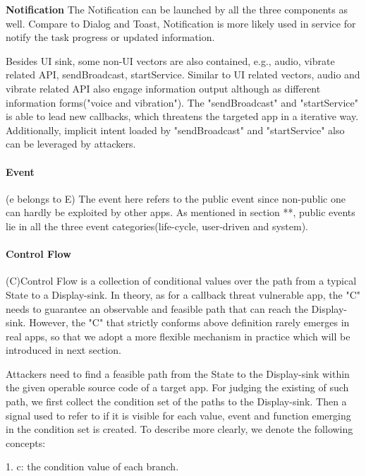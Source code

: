 \documentclass{sig-alternate-05-2015}
\begin{document}
\textbf{Notification}
The Notification can be launched by all the three components as well. Compare to Dialog and Toast, Notification is more likely used in service for notify the task progress or updated information. 



Besides UI sink, some non-UI vectors are also contained, e.g., audio, vibrate related API, sendBroadcast, startService. Similar to UI related vectors, audio and vibrate related API also engage information output although as different information forms("voice and vibration"). The "sendBroadcast" and "startService" is able to lead new callbacks, which threatens the targeted app in a iterative way. Additionally, implicit intent loaded by "sendBroadcast" and "startService" also can be leveraged by attackers.

\paragraph{Event}

(e belongs to E) The event here refers to the public event since non-public one can hardly be exploited by other apps. As mentioned in section **, public events lie in all the three event categories(life-cycle, user-driven and system).



\paragraph{Control Flow}

(C)Control Flow is a collection of conditional values over the path from a typical State to a Display-sink. In theory, as for a callback threat vulnerable app, the "C" needs to guarantee an observable and feasible path that can reach the Display-sink. However, the "C" that strictly conforms above definition rarely emerges in real apps, so that we adopt a more flexible mechanism in practice which will be introduced in next section.  

Attackers need to find a feasible path from the State to the Display-sink within the given operable source code of a target app. For judging the existing of such path, we first collect the condition set of the paths to the Display-sink. Then a signal used to refer to if it is visible for each value, event and function emerging in the condition set is created. To describe more clearly, we denote the following concepts:

1. c: the condition value of each branch.
\end{document}
